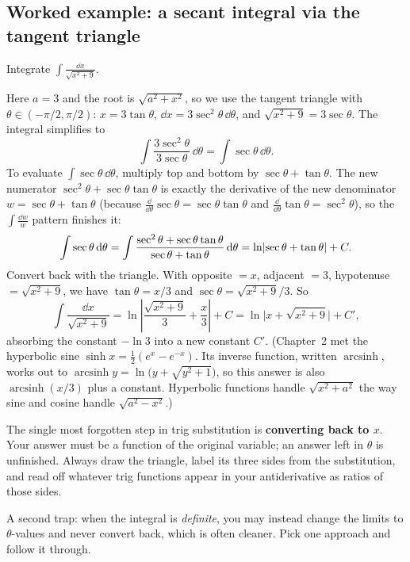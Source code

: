 \subsection{Worked example: a secant integral via the tangent triangle}

\begin{example}[Root of $a^2 + x^2$]
\label{ch24:ex-tan}
Integrate $\displaystyle \int \frac{\dd x}{\sqrt{x^2 + 9}}.$
\end{example}

Here $a = 3$ and the root is $\sqrt{a^2 + x^2}$, so we use the tangent triangle
with $\theta\in(-\pi/2,\pi/2)$: $x = 3\tan\theta$, $\dd x = 3\sec^2\theta\,\dd\theta$,
and $\sqrt{x^2+9} = 3\sec\theta$. The integral simplifies to
\[
\int \frac{3\sec^2\theta}{3\sec\theta}\,\dd\theta
= \int \sec\theta\,\dd\theta.
\]
To evaluate $\int\sec\theta\,\dd\theta$, multiply top and bottom by
$\sec\theta + \tan\theta$. The new numerator $\sec^2\theta + \sec\theta\tan\theta$ is
exactly the derivative of the new denominator $w = \sec\theta + \tan\theta$
(because $\tfrac{\dd}{\dd\theta}\sec\theta = \sec\theta\tan\theta$ and
$\tfrac{\dd}{\dd\theta}\tan\theta = \sec^2\theta$), so the
$\int\frac{\dd w}{w}$ pattern finishes it:
\[
\int \sec\theta\,\mathrm{d}\theta
= \int \frac{\sec^2\theta + \sec\theta\tan\theta}{\sec\theta + \tan\theta}\,\mathrm{d}\theta
= \ln\lvert\sec\theta + \tan\theta\rvert + C.
\]
Convert back with the triangle. With opposite $= x$, adjacent $= 3$,
hypotenuse $= \sqrt{x^2+9}$, we have $\tan\theta = x/3$ and $\sec\theta =
\sqrt{x^2+9}/3$. So
\[
\int \frac{\dd x}{\sqrt{x^2+9}}
= \ln\left|\frac{\sqrt{x^2+9}}{3} + \frac{x}{3}\right| + C
= \ln\big|x + \sqrt{x^2+9}\big| + C',
\]
absorbing the constant $-\ln 3$ into a new constant $C'$. (Chapter~2 met the
hyperbolic sine $\sinh x = \tfrac12(e^x - e^{-x})$. Its inverse function,
written $\operatorname{arcsinh}$, works out to
$\operatorname{arcsinh} y = \ln\bigl(y + \sqrt{y^2+1}\bigr)$, so this answer
is also $\operatorname{arcsinh}(x/3)$ plus a constant. Hyperbolic functions
handle $\sqrt{x^2+a^2}$ the way sine and cosine handle $\sqrt{a^2-x^2}$.)

\begin{trapbox}
The single most forgotten step in trig substitution is \textbf{converting back
to $x$}. Your answer must be a function of the original variable; an answer
left in $\theta$ is unfinished. Always draw the triangle, label its three
sides from the substitution, and read off whatever trig functions appear in
your antiderivative as ratios of those sides.

A second trap: when the integral is \emph{definite}, you may instead change the
limits to $\theta$-values and never convert back, which is often cleaner. Pick
one approach and follow it through.
\end{trapbox}

